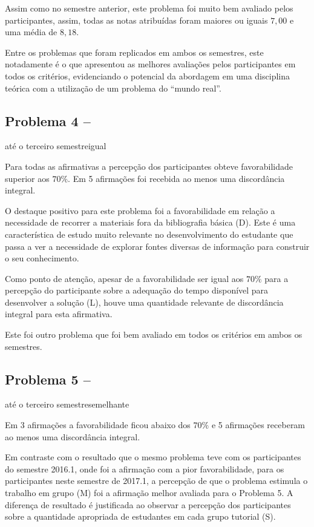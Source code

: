 Assim como no semestre anterior, este problema foi muito bem avaliado
pelos participantes, assim, todas as notas atribuídas foram maiores
ou iguais $7,00$ e uma média de $8,18$.

Entre os problemas que foram replicados em ambos os semestres, este
notadamente é o que apresentou as melhores avaliações pelos participantes
em todos os critérios, evidenciando o potencial da abordagem em uma
disciplina teórica com a utilização de um problema do ``mundo real''.

\subsection{Problema 4 -- \ProblemaD}
{até o terceiro semestre}{igual}

Para todas as afirmativas a percepção dos participantes obteve favorabilidade
superior aos $70\%$. Em 5 afirmações foi recebida ao menos uma discordância
integral.

O destaque positivo para este problema foi a favorabilidade em relação
a necessidade de recorrer a materiais fora da bibliografia básica (D).
Este é uma característica de estudo muito relevante no desenvolvimento
do estudante que passa a ver a necessidade de explorar fontes diversas
de informação para construir o seu conhecimento.

Como ponto de atenção, apesar de a favorabilidade ser igual aos $70\%$ para
a percepção do participante sobre a adequação do tempo disponível para desenvolver
a solução (L), houve uma quantidade relevante de discordância integral para esta afirmativa.

Este foi outro problema que foi bem avaliado em todos os critérios em ambos
os semestres.

\subsection{Problema 5 -- \ProblemaE}
{até o terceiro semestre}{semelhante}

Em 3 afirmações a favorabilidade ficou abaixo dos $70\%$ e 5 afirmações
receberam ao menos uma discordância integral.

Em contraste com o resultado que o mesmo problema teve com
os participantes do semestre 2016.1, onde foi a afirmação com a
pior favorabilidade, para os participantes neste semestre de
2017.1, a percepção de que o problema estimula o
trabalho em grupo (M) foi a afirmação melhor avaliada
para o Problema 5.
A diferença de resultado é justificada ao observar
a percepção dos participantes sobre a quantidade
apropriada de estudantes em cada grupo tutorial (S).

